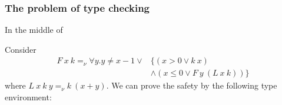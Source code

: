 \documentclass[runningheads]{llncs}
\newcommand \true {\textbf{tt}}
\newcommand \stypeint {\textbf{Int}}
\newcommand \stypebool {\bullet}
\newcommand \typeint[1]{{#1} : \stypeint}
\newcommand \typebool[1]{\stypebool \langle #1 \rangle}
\begin{document}
%
%
%
%
%
%
%

\subsubsection{The problem of type checking}

In the middle of

Consider
\begin{align*}
    F\ x\ k =_\nu \forall y. y \neq x - 1 \lor
        & \{ (x > 0 \lor k\ x)\\
        & \land ( x \leq 0 \lor F\ y\ (L\ x\ k)) \}
\end{align*}
where \( L\ x\ k\ y =_\nu k\ (x + y) \).
We can prove the safety by the following type environment:
\end{document}
